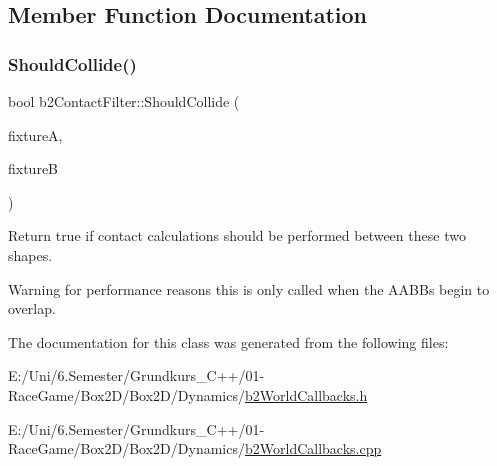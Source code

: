 \subsection{Member Function Documentation}
\mbox{\label{classb2_contact_filter_aac8f6155d1f577d125db587f5269289b}} 
\subsubsection{\texorpdfstring{ShouldCollide()}{ShouldCollide()}}
{\footnotesize\ttfamily bool b2\+Contact\+Filter\+::\+Should\+Collide (\begin{DoxyParamCaption}\item[{\mbox{\hyperlink{classb2_fixture}{b2\+Fixture}} $\ast$}]{fixtureA,  }\item[{\mbox{\hyperlink{classb2_fixture}{b2\+Fixture}} $\ast$}]{fixtureB }\end{DoxyParamCaption})\hspace{0.3cm}{\ttfamily [virtual]}}

Return true if contact calculations should be performed between these two shapes. \begin{DoxyWarning}{Warning}
for performance reasons this is only called when the A\+A\+B\+Bs begin to overlap. 
\end{DoxyWarning}


The documentation for this class was generated from the following files\+:\begin{DoxyCompactItemize}
\item 
E\+:/\+Uni/6.\+Semester/\+Grundkurs\+\_\+\+C++/01-\/\+Race\+Game/\+Box2\+D/\+Box2\+D/\+Dynamics/\mbox{\hyperlink{b2_world_callbacks_8h}{b2\+World\+Callbacks.\+h}}\item 
E\+:/\+Uni/6.\+Semester/\+Grundkurs\+\_\+\+C++/01-\/\+Race\+Game/\+Box2\+D/\+Box2\+D/\+Dynamics/\mbox{\hyperlink{b2_world_callbacks_8cpp}{b2\+World\+Callbacks.\+cpp}}\end{DoxyCompactItemize}
